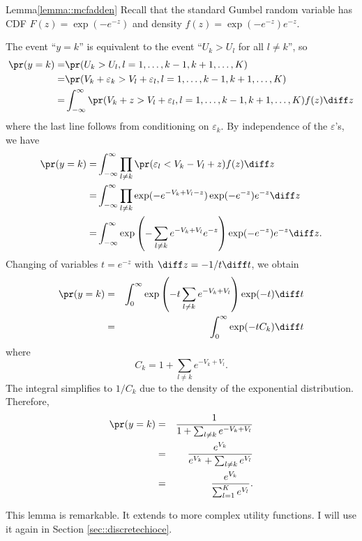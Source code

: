 \begin{myproof}{Lemma}{\ref{lemma::mcfadden}}
Recall that the standard Gumbel random variable has 
CDF
$
F(z)=\exp(-e^{-z})
$
and density
$
f(z)=\exp(-e^{-z})e^{-z} . 
$


The event ``$y=k$'' is equivalent to the event ``$U_{k}>U_{l}$
for all $l\neq k$'', so
\begin{align*}
\pr(y  =k)=& \pr(U_{k}>U_{l},l=1,\ldots,k-1,k+1,\ldots,K)\\
= & \pr(V_{k}+\varepsilon_{k}>V_{l}+\varepsilon_{l},l=1,\ldots,k-1,k+1,\ldots,K)\\
= & \int_{-\infty}^{\infty}\pr(V_{k}+z>V_{l}+\varepsilon_{l},l=1,\ldots,k-1,k+1,\ldots,K)f(z) \diff z
\end{align*}
where the last line follows from conditioning on $\varepsilon_k$. By independence of the $\varepsilon$'s, we have
\begin{align*}
\pr(y  =k)= & \int_{-\infty}^{\infty}\prod_{l\neq k}\pr(\varepsilon_{l}<V_{k}-V_{l}+z)f(z) \diff z\\
= & \int_{-\infty}^{\infty}\prod_{l\neq k}\exp(-e^{-V_{k}+V_{l}-z})\exp(-e^{-z})e^{-z}  \diff z\\
= & \int_{-\infty}^{\infty}\exp\left(-\sum_{l\neq k}e^{-V_{k}+V_{l}}e^{-z} \right)\exp(-e^{-z})e^{-z} \diff z.
\end{align*}
Changing of variables $t=e^{-z}$ with $\diff z=-1/t \diff t$, we obtain
\begin{eqnarray*}
\pr(y  =k) 
&=&\int_{0}^{\infty}\exp \left(-t\sum_{l\neq k}e^{-V_{k}+V_{l}} \right)\exp(-t)\diff t  \\
&=&\int_{0}^{\infty}\exp(-tC_{k})\diff t\\
\end{eqnarray*}
where
\[
C_{k}=1+\sum_{l\neq k}e^{-V_{k}+V_{l}}.
\]
The integral simplifies to $1/C_{k}$ due to the density of the exponential
distribution. Therefore,
\begin{eqnarray*}
\pr(y=k)  
&=&  \frac{1}{1+\sum_{l\neq k}e^{-V_{k}+V_{l}}}\\
&=&\frac{e^{V_{k}}}{e^{V_{k}}+\sum_{l\neq k}e^{V_{l}}} \\
&=&\frac{e^{V_{k}}}{\sum_{l=1}^{K}e^{V_{l}}}.
\end{eqnarray*}
\end{myproof}


This lemma is remarkable. It extends to more complex utility functions. I will use it again in Section \ref{sec::discretechioce}. 



